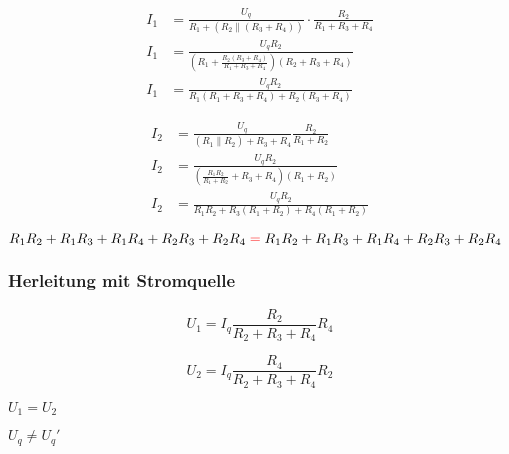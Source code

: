 \begin{multicols*}{2}
    \begin{center}
        
    \end{center}
    \begin{align*}
        I_1 &= \frac{U_q}{R_1 + (R_2 \parallel (R_3 + R_4))} \cdot \frac{R_2}{R_1 + R_3 + R_4}\\
        I_1 &= \frac{U_q R_2}{\left(R_1 + \frac{R_2(R_3 + R_4)}{R_1 + R_3 + R_4}\right)\left(R_2 + R_3 + R_4\right)}\\
        I_1 &= \frac{U_q R_2}{R_1(R_1 + R_3 + R_4) + R_2(R_3 + R_4)}
    \end{align*}
    \newcolumn

    \begin{center}
        
    \end{center}
    \begin{align*}
        I_2 &= \frac{U_q}{(R_1 \parallel R_2) + R_3 + R_4 }\frac{R_2}{R_1 + R_2}\\
        I_2 &= \frac{U_q R_2}{\left(\frac{R_1 R_2}{R_1 + R_2} + R_3 + R_4 \right)(R_1 + R_2)}\\
        I_2 &= \frac{U_q R_2}{R_1 R_2 + R_3 (R_1 + R_2) + R_4(R_1 + R_2)}
    \end{align*}

\end{multicols*}
\begin{center}
    $R_1 R_2 + R_1 R_3 + R_1 R_4 + R_2 R_3 + R_2 R_4 \mathcolor{red}{=} R_1 R_2 + R_1 R_3 + R_1 R_4 + R_2 R_3 + R_2 R_4$
\end{center}

\subsubsection{Herleitung mit Stromquelle}

\begin{multicols*}{2}
    \begin{center}
        
    \end{center}
    \[U_1 = I_q \frac{R_2}{R_2 + R_3 + R_4} R_4\]
    \newcolumn

    
    \[U_2 = I_q \frac{R_4}{R_2 + R_3 + R_4} R_2\]

\end{multicols*}
\begin{center}
    $U_1 = U_2$\\
    \begin{tcolorbox}[colframe=red , colback=white, arc is curved, hbox]
        $U_q \neq U_q'$
    \end{tcolorbox}
\end{center}


